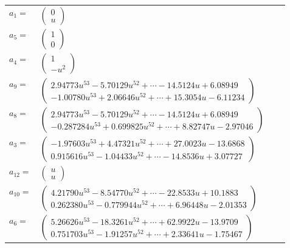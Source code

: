 \documentclass[1p]{elsarticle_modified}
\theoremstyle{definition}
\begin{document}
\begin{tabular}{m{7pt} m{180pt} m{7pt} m{180pt} }
\flushright $a_{1}=$&$\begin{pmatrix}0\\u\end{pmatrix}$ \\
\flushright $a_{5}=$&$\begin{pmatrix}1\\0\end{pmatrix}$ \\
\flushright $a_{4}=$&$\begin{pmatrix}1\\- u^2\end{pmatrix}$ \\
\flushright $a_{9}=$&$\begin{pmatrix}2.94773 u^{53}-5.70129 u^{52}+\cdots-14.5124 u+6.08949\\-1.00780 u^{53}+2.06646 u^{52}+\cdots+15.3054 u-6.11234\end{pmatrix}$ \\
\flushright $a_{8}=$&$\begin{pmatrix}2.94773 u^{53}-5.70129 u^{52}+\cdots-14.5124 u+6.08949\\-0.287284 u^{53}+0.699825 u^{52}+\cdots+8.82747 u-2.97046\end{pmatrix}$ \\
\flushright $a_{3}=$&$\begin{pmatrix}-1.97603 u^{53}+4.47321 u^{52}+\cdots+27.0023 u-13.6868\\0.915616 u^{53}-1.04433 u^{52}+\cdots-14.8536 u+3.07727\end{pmatrix}$ \\
\flushright $a_{12}=$&$\begin{pmatrix}u\\u\end{pmatrix}$ \\
\flushright $a_{10}=$&$\begin{pmatrix}4.21790 u^{53}-8.54770 u^{52}+\cdots-22.8533 u+10.1883\\0.262380 u^{53}-0.779944 u^{52}+\cdots+6.96448 u-2.01353\end{pmatrix}$ \\
\flushright $a_{6}=$&$\begin{pmatrix}5.26626 u^{53}-18.3261 u^{52}+\cdots+62.9922 u-13.9709\\0.751703 u^{53}-1.91257 u^{52}+\cdots+2.33641 u-1.75467\end{pmatrix}$ \\

\end{tabular}
\end{document}
